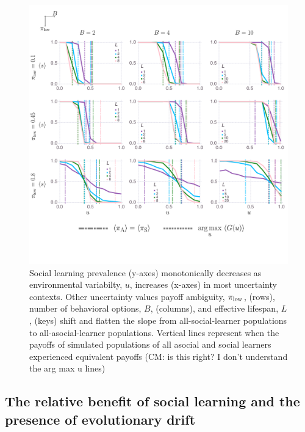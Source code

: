 \documentclass[letterpaper,11.5pt]{scrartcl}
\newcommand{\cm}[1]{{\textcolor{mypurple} {({\tiny CM:} #1)}}}
\begin{document}
\begin{figure}
  \caption{Social learning prevalence (y-axes) monotonically decreases as 
  environmental variabilty, $u$, increases (x-axes) in most uncertainty contexts. 
  Other uncertainty values payoff ambiguity, $\pi_{\mathrm{low}}$, (rows), number of behavioral options, $B$, (columns), and effective lifespan, $L$, (keys) shift and flatten the slope from all-social-learner populations to all-asocial-learner
  populations. Vertical lines represent when the payoffs of simulated populations of all asocial and social learners experienced equivalent payoffs \cm{is this right? I don't understand the arg max u lines} }
  \label{fig:mainResults}
  \centering
    \includegraphics[width=\textwidth]{Figures/mainResultsPlots.pdf}
\end{figure}

\subsection{The relative benefit of social learning and the presence of evolutionary drift}
\end{document}
